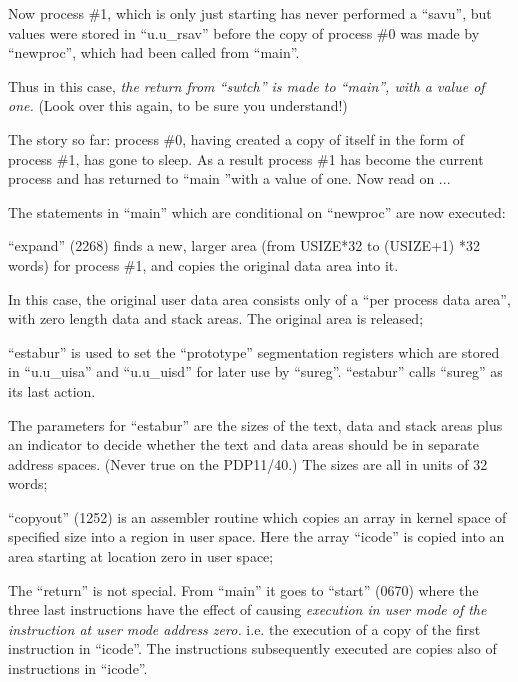 Now process \#1, which is only just
starting has never performed a ``savu'',
but values were stored in ``u.u\_rsav''
before the copy of process \#0 was made
by ``newproc'', which had been called
from ``main''.

Thus in this case, {\it the return from
``swtch'' is made to ``main'', with a value
of one.} (Look over this again, to be
sure you understand!)


The story so far: process \#0, having
created a copy of itself in the form of
process \#1, has gone to sleep. As a
result process \#1 has become the
current process and has returned to
``main ''with a value of one. Now read
on ...

\bd
\item[1627:] The statements in ``main'' which
 are conditional on ``newproc'' are
 now executed:

\item[1628:] ``expand'' (2268) finds a new,
 larger area (from USIZE*32 to
 (USIZE+1) *32 words) for process
 \#1, and copies the original data
 area into it.

In this case, the original user
data area consists only of a ``per
process data area'', with zero
length data and stack areas. The
original area is released;

\item[1629:] ``estabur'' is used to set the
 ``prototype'' segmentation registers which are stored in
 ``u.u\_uisa'' and ``u.u\_uisd'' for
 later use by ``sureg''. ``estabur''
 calls ``sureg'' as its last action.


The parameters for ``estabur'' are
the sizes of the text, data and
stack areas plus an indicator to
decide whether the text and data
areas should be in separate
address spaces. (Never true on
the PDP11/40.) The sizes are all
in units of 32 words;

\item[1630:] ``copyout'' (1252) is an assembler
 routine which copies an array in
 kernel space of specified size
 into a region in user space. Here
 the array ``icode'' is copied into
 an area starting at location zero
 in user space;

\item[1635:] The ``return'' is not special. From
 ``main'' it goes to ``start'' (0670)
 where the three last instructions
 have the effect of causing
 {\it execution in user mode of the
 instruction at user mode address
 zero.} i.e. the execution of a
copy of the first instruction in
``icode''. The instructions subsequently executed are copies also
of instructions in ``icode''.
\ed

